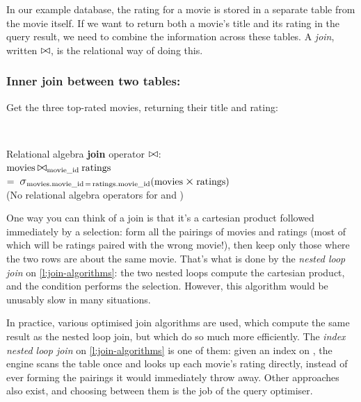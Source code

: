 In our example database, the rating for a movie is stored in a separate table from the movie itself.
If we want to return both a movie's title and its rating in the query result, we need to combine the information across these tables.
A \emph{join}, written $\rabin{\bowtie}$, is the relational way of doing this.

\begin{frame}
    \label{s:joins}
    \frametitle{Inner join between two tables: }
    Get the three top-rated movies, returning their title and rating:
    \inputminted[fontsize=\footnotesize]{sql}{code/sql-join.sql}
    \vspace{0.4em}
    {\footnotesize}\\[0.7em]\pause
    Relational algebra \textbf{join} operator $\rabin{\bowtie}$:\\[0.7em]
    \hspace*{1em}$\ra{movies} \rabin{\bowtie}_{\ra{movie\_id}} \ra{ratings}$\\
    \hspace*{1em}$=\; \raop{\sigma}_{\ra{movies.movie\_id} \,=\, \ra{ratings.movie\_id}}(\ra{movies} \rabin{\times} \ra{ratings})$\\[0.7em]
    (No relational algebra operators for  and )
\end{frame}
\label{l:joins}

One way you can think of a join is that it's a cartesian product followed immediately by a selection: form all the pairings of movies and ratings (most of which will be ratings paired with the wrong movie!), then keep only those where the two rows are about the same movie.
That's what is done by the \emph{nested loop join} on \autoref{l:join-algorithms}: the two nested loops compute the cartesian product, and the  condition performs the selection.
However, this algorithm would be unusably slow in many situations.

In practice, various optimised join algorithms are used, which compute the same result as the nested loop join, but which do so much more efficiently.
The \emph{index nested loop join} on \autoref{l:join-algorithms} is one of them: given an index on , the engine scans the  table once and looks up each movie's rating directly, instead of ever forming the pairings it would immediately throw away.
Other approaches also exist, and choosing between them is the job of the query optimiser.


